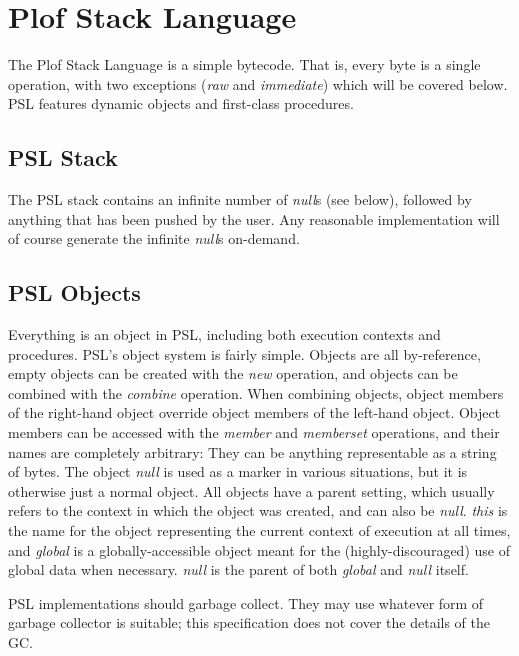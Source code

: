 \chapter{Plof Stack Language}

The Plof Stack Language is a simple bytecode. That is, every byte is a single operation, with two exceptions (\textit{raw} and \textit{immediate}) which will be covered below. PSL features dynamic objects and first-class procedures.



\section{PSL Stack}

The PSL stack contains an infinite number of \textit{null}s (see below), followed by anything that has been pushed by the user. Any reasonable implementation will of course generate the infinite \textit{null}s on-demand.



\section{PSL Objects}

Everything is an object in PSL, including both execution contexts and procedures. PSL's object system is fairly simple. Objects are all by-reference, empty objects can be created with the \textit{new} operation, and objects can be combined with the \textit{combine} operation. When combining objects, object members of the right-hand object override object members of the left-hand object. Object members can be accessed with the \textit{member} and \textit{memberset} operations, and their names are completely arbitrary: They can be anything representable as a string of bytes. The object \textit{null }is used as a marker in various situations, but it is otherwise just a normal object. All objects have a parent setting, which usually refers to the context in which the object was created, and can also be \textit{null}. \textit{this} is the name for the object representing the current context of execution at all times, and \textit{global} is a globally-accessible object meant for the (highly-discouraged) use of global data when necessary. \textit{null} is the parent of both \textit{global} and \textit{null} itself.

PSL implementations should garbage collect. They may use whatever form of garbage collector is suitable; this specification does not cover the details of the GC.



